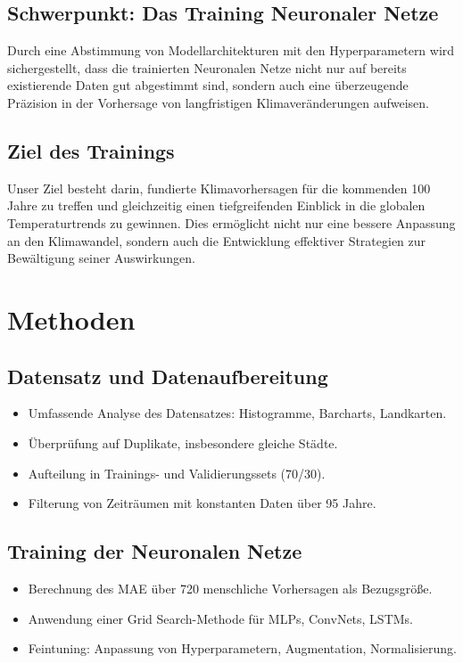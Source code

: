 \documentclass[manuscript,screen,review]{acmart}
\begin{document}
\subsection{Schwerpunkt: Das Training Neuronaler Netze}
 Durch eine Abstimmung von Modellarchitekturen mit den Hyperparametern wird sichergestellt, dass die trainierten Neuronalen Netze nicht nur auf bereits existierende Daten gut abgestimmt sind, sondern auch eine überzeugende Präzision in der Vorhersage von langfristigen Klimaveränderungen aufweisen. 

\subsection{Ziel des Trainings}
Unser Ziel besteht darin, fundierte Klimavorhersagen für die kommenden 100 Jahre zu treffen und gleichzeitig einen tiefgreifenden Einblick in die globalen Temperaturtrends zu gewinnen. Dies ermöglicht nicht nur eine bessere Anpassung an den Klimawandel, sondern auch die Entwicklung effektiver Strategien zur Bewältigung seiner Auswirkungen.


\section{Methoden}
\subsection*{Datensatz und Datenaufbereitung}
\begin{itemize}
    \item Umfassende Analyse des Datensatzes: Histogramme, Barcharts, Landkarten.
    \item Überprüfung auf Duplikate, insbesondere gleiche Städte.
    \item Aufteilung in Trainings- und Validierungssets (70/30).
    \item Filterung von Zeiträumen mit konstanten Daten über 95 Jahre.
\end{itemize}

\subsection*{Training der Neuronalen Netze}
\begin{itemize}
    \item Berechnung des MAE über 720 menschliche Vorhersagen als Bezugsgröße.
    \item Anwendung einer Grid Search-Methode für MLPs, ConvNets, LSTMs.
    \item Feintuning: Anpassung von Hyperparametern, Augmentation, Normalisierung.
\end{itemize}
\end{document}

